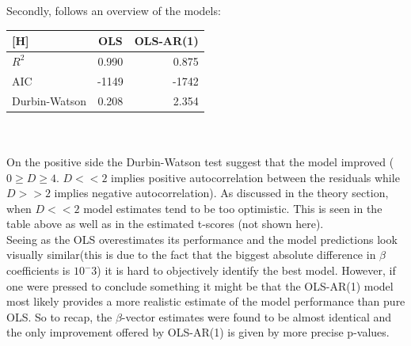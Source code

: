 Secondly, follows an overview of the models:
\begin{tabular}{l || c |  r}[H]
 & OLS & OLS-AR(1) \\ \hline
$R^2$ & 0.990 &0.875 \\
AIC & -1149 &-1742 \\
Durbin-Watson & 0.208 & 2.354
\end{tabular}\\\\
On the positive side the Durbin-Watson test suggest that the model improved  ($0\ge D\ge 4$. $D<<2$ implies positive autocorrelation between the residuals while $D>>2$ implies negative autocorrelation). 
As discussed in the theory section, when $D<<2$ model estimates tend to be too optimistic.
 This is seen in the table above as well as in the estimated t-scores (not shown here). 
\\
Seeing as the OLS overestimates its performance and the model predictions look visually similar(this is due to the fact that the biggest absolute difference in $\beta$ coefficients is $10^-3$) it is hard to objectively identify the best model.
 However, if one were pressed to conclude something it might be that the OLS-AR(1) model most likely provides a more realistic estimate of the model performance than pure OLS. 
So to recap, the $\beta$-vector estimates were found to be almost identical and the only improvement offered by OLS-AR(1) is given by more precise p-values.
